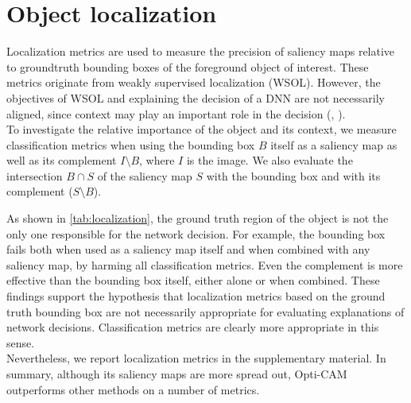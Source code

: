 \section{Object localization}
\label{sec:oc_loc}
Localization metrics are used to measure the precision of saliency maps relative to groundtruth 
bounding boxes of the foreground object of interest. These metrics originate from weakly supervised 
localization (WSOL). However, the objectives of WSOL and explaining the decision of a DNN are not 
necessarily aligned, since context may play an important role in the decision (\cite{shetty2019not}, 
\cite{rao2022towards}).\\

\noindent To investigate the relative importance of the object and its context, we measure 
classification metrics when using the bounding box $B$ itself as a saliency map as well as its 
complement $I \setminus B$, where $I$ is the image. We also evaluate the intersection $B \cap S$ 
of the saliency map $S$ with the bounding box and with its complement ($S \setminus B$).

\noindent As shown in \autoref{tab:localization}, the ground truth region of the object is not the 
only one responsible for the network decision. For example, the bounding box fails both when used 
as a saliency map itself and when combined with any saliency map, by harming all classification 
metrics. Even the complement is more effective than the bounding box itself, either alone or when 
combined. These findings support the hypothesis that localization metrics based on the ground truth 
bounding box are not necessarily appropriate for evaluating explanations of network decisions. 
Classification metrics are clearly more appropriate in this sense.\\

\noindent Nevertheless, we report localization metrics in the supplementary material. In summary, 
although its saliency maps are more spread out, Opti-CAM outperforms other methods on a number of 
metrics.

